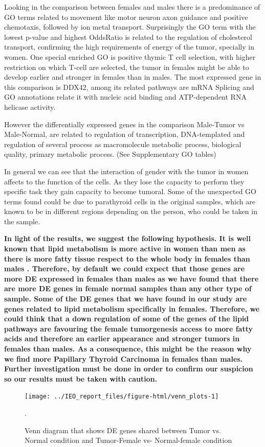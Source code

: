 \documentclass[9pt,twocolumn,twoside]{gsajnl}
\begin{document}
Looking in the comparison between females and males there is a predominance of GO terms related to movement like motor neuron axon guidance and positive chemotaxis, followed by ion metal transport. Surprisingly the GO term with the lowest p-value and highest OddsRatio is related to the regulation of cholesterol transport, confirming the high requirements of energy of the tumor, specially in women. One special enriched GO is positive thymic T cell selection, with higher restriction on which T-cell are selected, the tumor in females might be able to develop earlier and stronger in females than in males. The most expressed gene in this comparison is DDX42, among its related pathways are mRNA Splicing and GO annotations relate it with nucleic acid binding and ATP-dependent RNA helicase activity.

However the differentially expressed genes in the comparison Male-Tumor vs Male-Normal, are related to regulation of transcription, DNA-templated and regulation of several process as macromolecule metabolic process, biological quality, primary metabolic process. (See Supplementary GO tables)

In general we can see that the interaction of gender with the tumor in women affects to the function of the cells. As they lose the capacity to perform they specific task they gain capacity to become tumoral. Some of the unexpected GO terms found could be due to parathyroid cells in the original samples, which are known to be in different regions depending on the person, who could be taken in the sample.

\textbf{In light of the results, we suggest the following hypothesis. It is well known that lipid metabolism is more active in women than men as there is more fatty tissue respect to the whole body in females than males \citep{Blaak2001}. Therefore, by default we could expect that those genes are more DE expressed in females than males as we have found that there are more DE genes in female normal samples than any other type of sample. Some of the DE genes that we have found in our study are genes related to lipid metabolism specifically in females. Therefore, we could think that a down regulation of some of the genes of the lipid pathways are favouring the female tumorgenesis access to more fatty acids and therefore an earlier appearance and stronger tumors in females than males. As a consequence, this might be the reason why we find more Papillary Thyroid Carcinoma in females than males. Further investigation must be done in order to confirm our suspicion so our results must be taken with caution.}
 
\begin{figure}
\centering
\texttt{[image: ../IEO\_report\_files/figure-html/venn\_plots-1]}
\caption{Venn diagram that shows DE genes shared between Tumor vs. Normal condition and Tumor-Female vs- Normal-female condition }.
\label{fig:venn1}
\end{figure}

  

\end{document}
